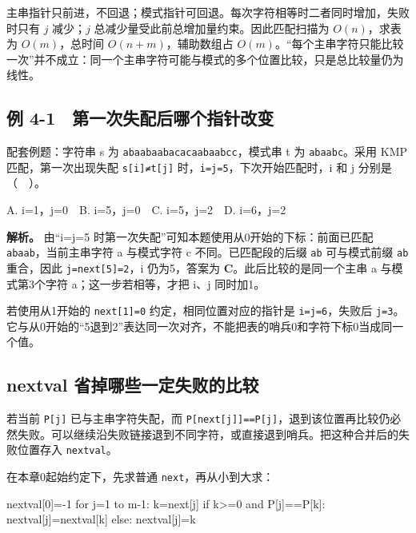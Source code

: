 主串指针只前进，不回退；模式指针可回退。每次字符相等时二者同时增加，失败时只有 \(j\) 减少；\(j\) 总减少量受此前总增加量约束。因此匹配扫描为 \(O(n)\)，求表为 \(O(m)\)，总时间 \(O(n+m)\)，辅助数组占 \(O(m)\)。``每个主串字符只能比较一次''并不成立：同一个主串字符可能与模式的多个位置比较，只是总比较量仍为线性。

\subsection{例 4-1　第一次失配后哪个指针改变}\label{DS04-ex1}

\begin{example}[配套例题]

配套例题：字符串 s 为 \texttt{abaabaabacacaabaabcc}，模式串 t 为 \texttt{abaabc}。采用 KMP 匹配，第一次出现失配 \texttt{s[i]≠t[j]} 时，\texttt{i=\allowbreak{}j=\allowbreak{}5}，下次开始匹配时，i 和 j 分别是（　）。

A. i=1，j=0　B. i=5，j=0　C. i=5，j=2　D. i=6，j=2

\end{example}

\textbf{解析。} 由``i=j=5 时第一次失配''可知本题使用从0开始的下标：前面已匹配 \texttt{abaab}，当前主串字符 a 与模式字符 c 不同。已匹配段的后缀 \texttt{ab} 可与模式前缀 \texttt{ab} 重合，因此 \texttt{j=\allowbreak{}next[5]=\allowbreak{}2}，i 仍为5，答案为 \textbf{C}。此后比较的是同一个主串 a 与模式第3个字符 a；这一步若相等，才把 i、j 同时加1。

若使用从1开始的 \texttt{next[1]=\allowbreak{}0} 约定，相同位置对应的指针是 \texttt{i=\allowbreak{}j=\allowbreak{}6}，失败后 \texttt{j=\allowbreak{}3}。它与从0开始的``5退到2''表达同一次对齐，不能把表的哨兵0和字符下标0当成同一个值。

\subsection{nextval 省掉哪些一定失败的比较}\label{DS04-detail2}

若当前 \texttt{P[j]} 已与主串字符失配，而 \texttt{P[next[j]]=\allowbreak{}=\allowbreak{}P[j]}，退到该位置再比较仍必然失败。可以继续沿失败链接退到不同字符，或直接退到哨兵。把这种合并后的失败位置存入 \texttt{nextval}。

在本章0起始约定下，先求普通 \texttt{next}，再从小到大求：

\begin{codeblock}[language={}]
nextval[0]=-1
for j=1 to m-1:
    k=next[j]
    if k>=0 and P[j]==P[k]: nextval[j]=nextval[k]
    else: nextval[j]=k
\end{codeblock}

